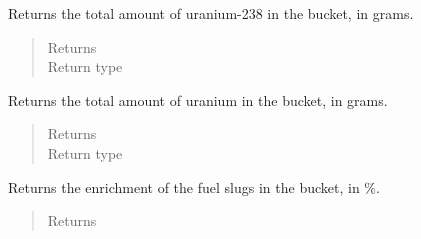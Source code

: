 \documentclass[letterpaper,10pt,openany,oneside,english]{sphinxmanual}
\begin{document}
\begin{fulllineitems}
\begin{fulllineitems}
\end{fulllineitems}


\begin{fulllineitems}
\label{\detokenize{support_rst/fuel_bucket:fuel_bucket.FuelBucket.fresh_u238_mass}}
Returns the total amount of uranium-238 in the bucket, in grams.
\begin{quote}\begin{description}
\item[{Returns}] \leavevmode
{}

\item[{Return type}] \leavevmode
{}

\end{description}\end{quote}

\end{fulllineitems}


\begin{fulllineitems}
\label{\detokenize{support_rst/fuel_bucket:fuel_bucket.FuelBucket.fresh_u_mass}}
Returns the total amount of uranium in the bucket, in grams.
\begin{quote}\begin{description}
\item[{Returns}] \leavevmode
{}

\item[{Return type}] \leavevmode
{}

\end{description}\end{quote}

\end{fulllineitems}


\begin{fulllineitems}
\label{\detokenize{support_rst/fuel_bucket:fuel_bucket.FuelBucket.fuel_enrichment}}
Returns the enrichment of the fuel slugs in the bucket, in \%.
\begin{quote}\begin{description}
\item[{Returns}] \leavevmode
{}


\end{description}
\end{quote}
\end{fulllineitems}
\end{fulllineitems}
\end{document}
